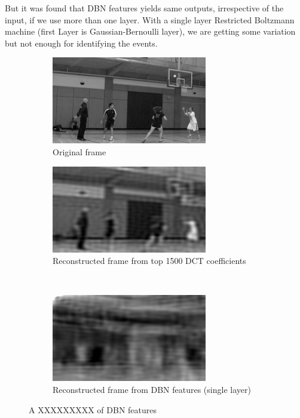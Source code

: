 But it was found that DBN features yields same outputs, irrespective of the input, if we use more than one layer. With a single layer Restricted Boltzmann machine (first Layer is Gaussian-Bernoulli layer), we are getting some variation but not enough for identifying the events.\\


\begin{figure}
        \centering
        \begin{subfigure}[b]{\textwidth}
        			\centering
                \includegraphics[scale=1]{./imgs/Original.png}
                \caption{Original frame}
                \label{fig:original}
        \end{subfigure}%
        
        \begin{subfigure}[b]{0.45\textwidth}
        		\centering
        		\includegraphics[scale=1]{./imgs/DCT.png}
        		\caption{Reconstructed frame from top 1500 DCT coefficients}
        		\label{fig:dct}
        \end{subfigure}
        ~%
        \begin{subfigure}[b]{0.45\textwidth}
        			\centering
                \includegraphics[scale=1]{./imgs/DBN.png}
                \caption{Reconstructed frame from DBN features (single layer)}
                \label{fig:dbn}
        \end{subfigure}
        \caption{ A XXXXXXXXX of DBN features}
        \label{fig:dct+dbn}
\end{figure}\\


